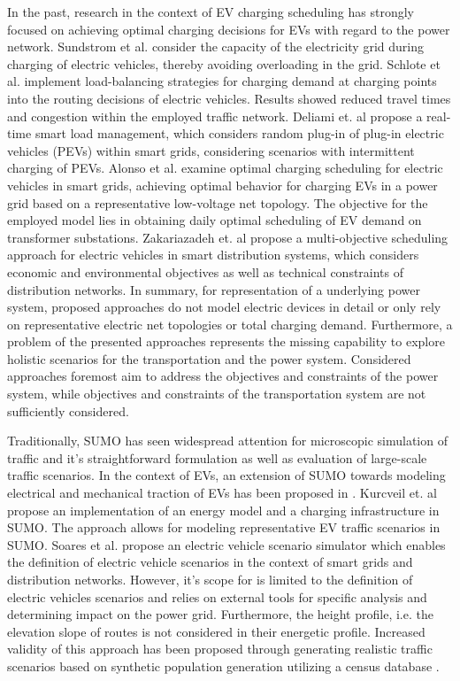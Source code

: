In the past, research in the context of EV charging scheduling has strongly focused on achieving optimal charging decisions for EVs with regard to the power network. Sundstrom et al. \cite{sundstrom2010planning} consider the capacity of the electricity grid during charging of electric vehicles, thereby avoiding overloading in the grid. Schlote et al. \cite{schlote2012balanced} implement load-balancing strategies for charging demand at charging points into the routing decisions of electric vehicles. Results showed reduced travel times and congestion within the employed traffic network. Deliami et. al \cite{deilami2011real} propose a real-time smart load management, which considers random plug-in of plug-in electric vehicles (PEVs) within smart grids, considering scenarios with intermittent charging of PEVs. Alonso et al. \cite{alonso2014optimal} examine optimal charging scheduling for electric vehicles in smart grids, achieving optimal behavior for charging EVs in a power grid based on a representative low-voltage net topology. The objective for the employed model lies in obtaining daily optimal scheduling of EV demand on transformer substations. Zakariazadeh et. al \cite{zakariazadeh2014multi} propose a multi-objective scheduling approach for electric vehicles in smart distribution systems, which considers economic and environmental objectives as well as technical constraints of distribution networks. In summary, for representation of a underlying power system, proposed approaches do not model electric devices in detail or only rely on representative electric net topologies or total charging demand. Furthermore, a problem of the presented approaches represents the missing capability to explore holistic scenarios for the transportation and the power system. Considered approaches foremost aim to address the objectives and constraints of the power system, while objectives and constraints of the transportation system are not sufficiently considered.

Traditionally, SUMO \cite{behrisch2011sumo} has seen widespread attention for microscopic simulation of traffic and it's straightforward formulation as well as evaluation of large-scale traffic scenarios. In the context of EVs, an extension of SUMO towards modeling electrical and mechanical traction of EVs has been proposed in \cite{maia2011electric}. Kurcveil et. al \cite{kurczveil2014implementation} propose an implementation of an energy model and a charging infrastructure in SUMO. The approach allows for modeling representative EV traffic scenarios in SUMO. Soares et al. \cite{soares2012electric} propose an electric vehicle scenario simulator which enables the definition of electric vehicle scenarios in the context of smart grids and distribution networks. However, it's scope for is limited to the definition of electric vehicles scenarios and relies on external tools for specific analysis and determining impact on the power grid. Furthermore, the height profile, i.e. the elevation slope of routes is not considered in their energetic profile. Increased validity of this approach has been proposed through generating realistic traffic scenarios based on synthetic population generation utilizing a census database \cite{soares2014realistic}.


